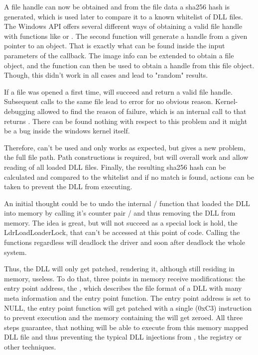 A file handle can now be obtained and from the file data a sha256 hash is generated, which is used later to compare it to a known whitelist of DLL files. The Windows API offers several different ways of obtaining a valid file handle with functions like  or . The second function  will generate a handle from a given pointer to an object. That is exactly what can be found inside the input parameters of the  callback. The image info can be extended to obtain a file object, and the  function can then be used to obtain a handle from this file object. Though, this didn't work in all cases and lead to "random" results. 

If a file was opened a first time,  will succeed and return a valid file handle. Subsequent calls to the same file lead to error  for no obvious reason. Kernel-debugging allowed to find the reason of failure, which is an internal call to  that returns . There can be found nothing with respect to this problem and it might be a bug inside the windows kernel itself. 

Therefore,  can't be used and only  works as expected, but gives a new problem, the full file path. Path constructions is required, but will overall work and allow reading of all loaded DLL files. Finally, the resulting sha256 hash can be calculated and compared to the whitelist and if no match is found, actions can be taken to prevent the DLL from executing. 

An initial thought could be to undo the internal  /  function that loaded the DLL into memory by calling it's counter pair  /  and thus removing the DLL from memory. The idea is great, but will not succeed as a special lock is hold, the LdrLoadLoaderLock, that can't be accessed at this point of code. Calling the functions regardless will deadlock the driver and soon after deadlock the whole system.

Thus, the DLL will only get patched, rendering it, although still residing in memory, useless. To do that, three points in memory receive modifications: the entry point address, the , which describes the file format of a DLL with many meta information and the entry point function. The entry point address is set to NULL, the entry point function will get patched with a single  (0xC3) instruction to prevent execution and the memory containing the  will get zeroed. All three steps guarantee, that nothing will be able to execute from this memory mapped DLL file and thus preventing the typical DLL injections from , the registry or other techniques.